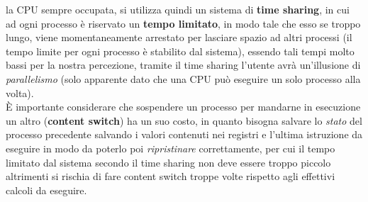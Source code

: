 \documentclass[12pt, letterpaper]{article}
\begin{document}
la CPU sempre occupata, si utilizza quindi un sistema di \textbf{time sharing}, in cui ad ogni processo 
è riservato un \textbf{tempo limitato}, in modo tale che esso se troppo lungo, viene momentaneamente arrestato per 
lasciare spazio ad altri processi (il tempo limite per ogni processo è stabilito dal sistema), essendo tali tempi 
molto bassi per la nostra percezione, tramite il time sharing l'utente avrà un'illusione di \textit{parallelismo} 
(solo apparente dato che una CPU può eseguire un solo processo alla volta).\\
È importante considerare che sospendere un processo per mandarne in esecuzione un altro 
(\textbf{content switch}) ha un suo costo, in quanto bisogna salvare lo \textit{stato} del processo precedente
salvando i valori contenuti nei registri e l'ultima istruzione da eseguire in modo da poterlo poi 
\textit{ripristinare} correttamente, per cui il tempo limitato dal sistema secondo il time sharing non deve 
essere troppo piccolo altrimenti si rischia di fare content switch troppe volte rispetto agli effettivi 
calcoli da eseguire.
\end{document}
